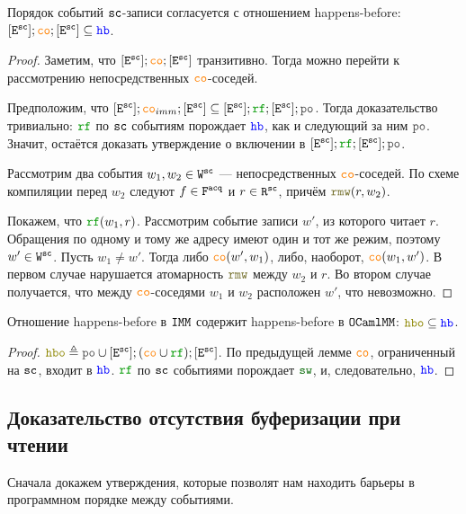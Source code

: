 \begin{lemma}
  \label{sc-co-hb}
  Порядок событий ${\mathtt{sc}}$-записи согласуется с отношением happens-before: $[\lE^{\sco}] ; \lCO ; [\lE^{\sco}] \subseteq \lHB$. 
\end{lemma}

\begin{proof}
  Заметим, что  $[\lE^{\sco}] ; \lCO ; [\lE^{\sco}]$ транзитивно. Тогда можно перейти к рассмотрению непосредственных $\lCO$-соседей. 

  Предположим, что $[\lE^{\sco}] ; \lCO_{imm} ; [\lE^{\sco}] \subseteq [\lE^{\sco}] ; \lRF ; [\lE^{\sco}] ; \lPO$. Тогда доказательство тривиально: $\lRF$ по ${\mathtt{sc}}$ событиям порождает $\lHB$, как и следующий за ним $\lPO$. Значит, остаётся доказать утверждение о включении в $[\lE^{\sco}] ; \lRF ; [\lE^{\sco}] ; \lPO$.

  Рассмотрим два события $w_1, w_2 \in {\mathtt{W}}^{{\mathtt{sc}}}$ --- непосредственных $\lCO$-соседей. По схеме компиляции перед $w_2$ следуют $f\in {\mathtt{F}}^{{\mathtt{acq}}}$ и $r \in {\mathtt{R}}^{{\mathtt{sc}}}$, причём $\lRMW(r, w_2)$.

  Покажем, что $\lRF(w_1, r)$. Рассмотрим событие записи $w'$, из которого читает $r$. Обращения по одному и тому же адресу имеют один и тот же режим, поэтому $w' \in {\mathtt{W}}^{\mathtt{sc}}$. 
  Пусть $w_1\neq w'$. Тогда либо $\lCO(w', w_1)$, либо, наоборот, $\lCO(w_1, w')$. В первом случае нарушается атомарность $\lRMW$ между $w_2$ и $r$. Во втором случае получается, что между $\lCO$-соседями $w_1$ и $w_2$ расположен $w'$, что невозможно. 
\end{proof}

\begin{lemma}
  \label{hbo-in-hb}
  Отношение happens-before в $\mathtt{IMM}$ содержит happens-before в $\mathtt{OCaml}\allowbreak \mathtt{MM}$: $\lHBO \subseteq \lHB$. 
\end{lemma}
\begin{proof}
  $\lHBO \defeq \lPO \cup [\lE^{\sco}] ; (\lCO \cup \lRF) ; [\lE^{\sco}]$. По предыдущей лемме $\lCO$, ограниченный на ${\mathtt{sc}}$, входит в $\lHB$. $\lRF$ по ${\mathtt{sc}}$ событиями порождает $\lSW$, и, следовательно, $\lHB$. 
\end{proof}

\subsection{Доказательство отсутствия буферизации при чтении}
\label{corr-causality}
Сначала докажем утверждения, которые позволят нам находить барьеры в программном порядке между событиями.

